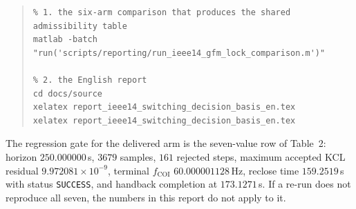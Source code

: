 \documentclass[12pt,a4paper]{article}
\theoremstyle{remark}
\newcommand{\code}[1]{\texttt{\small #1}}
\begin{document}
\begin{quote}\small
\begin{verbatim}
% 1. the six-arm comparison that produces the shared admissibility table
matlab -batch "run('scripts/reporting/run_ieee14_gfm_lock_comparison.m')"

% 2. the English report
cd docs/source
xelatex report_ieee14_switching_decision_basis_en.tex
xelatex report_ieee14_switching_decision_basis_en.tex
\end{verbatim}
\end{quote}

\noindent
The regression gate for the delivered arm is the seven-value row of Table~2:
horizon $250.000000$\,s, $3679$ samples, $161$ rejected steps, maximum accepted
KCL residual $9.972081\times10^{-9}$, terminal $f_{\mathrm{COI}}$
$60.000001128$\,Hz, reclose time $159.2519$\,s with status \code{SUCCESS}, and
handback completion at $173.1271$\,s. If a re-run does not reproduce all seven,
the numbers in this report do not apply to it.
\end{document}
